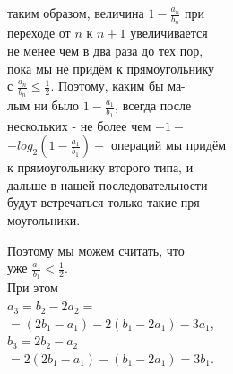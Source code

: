 \documentclass{article}
\begin{document}
\begin{multicols}{2}
\setlength{\parindent}{0pt} 
\indent 
\\
\\
таким образом, величина $1-\frac{a_n}{b_n}$ при\\
переходе от $n$ к $n+1$ увеличивается\\
не менее чем в два раза до тех пор,\\
пока мы не придём к прямоугольнику\\
с $\frac{a_n}{b_n}\leq\frac{1}{2}$. Поэтому, каким бы ма-\\
лым ни было $1-\frac{a_1}{b_1}$, всегда после\\
нескольких - не более чем $-1-$\\
$-log_2 (1-\frac{a_1}{b_1})-$ операций мы придём\\
к прямоугольнику второго типа, и\\
дальше в нашей последовательности\\
будут встречаться только такие пря-\\
моугольники.

\setlength{\parindent}{22pt} 
\indent Поэтому мы можем считать, что\\
уже $\frac{a_1}{b_1}<\frac{1}{2}$.\\
\indent При этом\\
$a_3=b_2-2a_2=$\\
\setlength{\parindent}{45pt}
\indent $=(2b_1-a_1)-2(b_1-2a_1)-3a_1$,\\
\setlength{\parindent}{0pt}
\indent $b_3=2b_2-a_2$\\
\setlength{\parindent}{40pt}
\indent $=2(2b_1-a_1)-(b_1-2a_1)=3b_1$.\\


\end{multicols}
\end{document}
